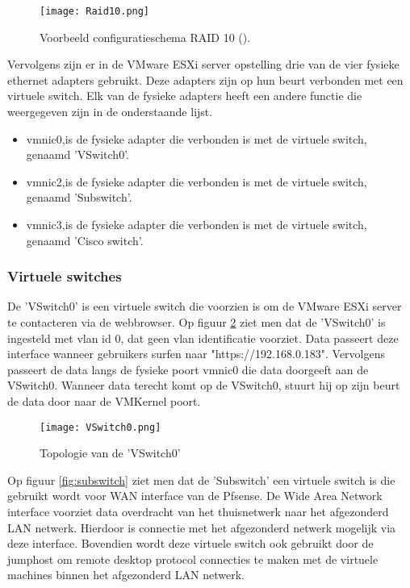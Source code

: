 \begin{figure}[H]
	\centering
	\texttt{[image: Raid10.png]}
	\caption{Voorbeeld configuratieschema RAID 10 (\cite{Raid10}).}
	\label{fig:Raid10}
\end{figure}

Vervolgens zijn er in de VMware ESXi server opstelling drie van de vier fysieke ethernet adapters gebruikt. Deze adapters zijn op hun beurt verbonden met een virtuele switch. Elk van de fysieke adapters heeft een andere functie die weergegeven zijn in de onderstaande lijst. 

\begin{itemize}
	\item vmnic0,is de fysieke adapter die verbonden is met de virtuele switch, genaamd 'VSwitch0'.
	\item vmnic2,is de fysieke adapter die verbonden is met de virtuele switch, genaamd 'Sub\textunderscore switch'.
	\item vmnic3,is de fysieke adapter die verbonden is met de virtuele switch, genaamd 'Cisco \textunderscore switch'.
\end{itemize}

\newpage
\subsubsection{Virtuele switches}
\newline
De 'VSwitch0' is een virtuele switch die voorzien is om de VMware ESXi server te contacteren via de webbrowser. Op figuur \ref{fig:Vswitch0} ziet men dat de 'VSwitch0' is ingesteld met vlan id 0, dat geen vlan identificatie voorziet. 
\newline
\newline
Data passeert deze interface wanneer gebruikers surfen naar "https://192.168.0.183". Vervolgens passeert de data langs de fysieke poort vmnic0 die data doorgeeft aan de VSwitch0. Wanneer data terecht komt op de VSwitch0, stuurt hij op zijn beurt de data door naar de VMKernel poort.

\begin{figure}[H]
	\centering
	\texttt{[image: VSwitch0.png]}
	\caption{Topologie van de 'VSwitch0'}
	\label{fig:Vswitch0}
\end{figure}

\newline
Op figuur \ref{fig:subswitch} ziet men dat de 'Sub\textunderscore switch' een virtuele switch is die gebruikt wordt voor WAN interface van de Pfsense. De Wide Area Network interface voorziet data overdracht van het thuisnetwerk naar het afgezonderd LAN netwerk. Hierdoor is connectie met het afgezonderd netwerk mogelijk via deze interface. Bovendien wordt deze virtuele switch ook gebruikt door de jumphost om remote desktop protocol connecties te maken met de virtuele machines binnen het afgezonderd LAN netwerk. 

